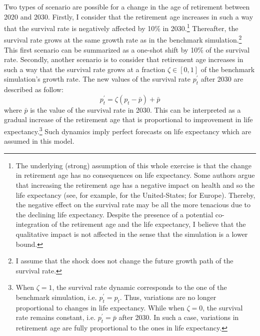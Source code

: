 Two types of scenario are possible for a change in the age of retirement between 2020 and 2030. Firstly, I consider that the retirement age increases in such a way that the survival rate is negatively affected by 10\% in 2030.\footnote{The underlying (strong) assumption of this whole exercise is that the change in retirement age has no consequences on life expectancy. Some authors argue that increasing the retirement age has a negative impact on health and so the life expectancy (see, for example, \citealt{Insler2014} for the United-States; \citealt{Coe2011} for Europe). Thereby, the negative effect on the survival rate may be all the more tenacious due to the declining life expectancy. Despite the presence of a potential co-integration of the retirement age and the life expectancy, I believe that the qualitative impact is not affected in the sense that the simulation is a lower bound.} Thereafter, the survival rate grows at the same growth rate as in the benchmark simulation.\footnote{I assume that the shock does not change the future growth path of the survival rate.} This first scenario can be summarized as a one-shot shift by 10\% of the survival rate. Secondly, another scenario is to consider that retirement age increases in such a way that the survival rate grows at a fraction $\zeta \in \left[0,1\right]$ of the benchmark simulation's growth rate. The new values of the survival rate $p^\prime_t$ after 2030 are described as follow:
\begin{equation*}
	p^\prime_t = \zeta(p_t - \bar{p}) + \bar{p}
\end{equation*}
where $\bar{p}$ is the value of the survival rate in 2030. This can be interpreted as a gradual increase of the retirement age that is proportional to improvement in life expectancy.\footnote{When $\zeta = 1$, the survival rate dynamic corresponds to the one of the benchmark simulation, i.e. $p_t^\prime = p_t$. Thus, variations are no longer proportional to changes in life expectancy. While when $\zeta = 0$, the survival rate remains constant, i.e. $p_t^\prime = \bar{p}$ after 2030. In such a case, variations in retirement age are fully proportional to the ones in life expectancy.} Such dynamics imply perfect forecasts on life expectancy which are assumed in this model.

